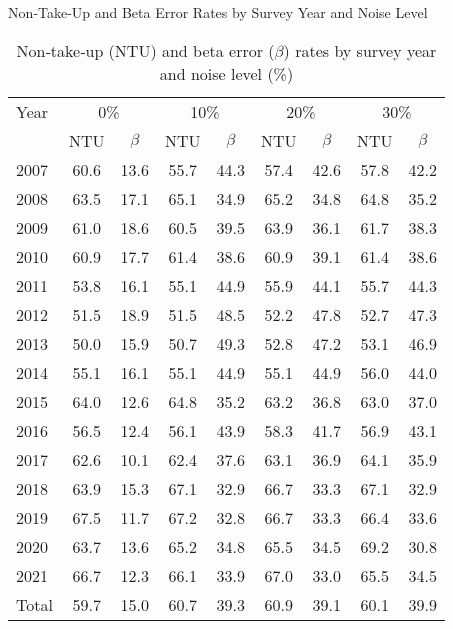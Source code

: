 \begin{table}[htbp]
\setlength{\tabcolsep}{10pt}
\small
\centering
\caption*{Non‑Take‑Up and Beta Error Rates by Survey Year and Noise Level}
\begin{tabular}{l|cc|cc|cc|cc}
\toprule
Year 
  & \multicolumn{2}{c|}{0\%} 
  & \multicolumn{2}{c|}{10\%} 
  & \multicolumn{2}{c|}{20\%} 
  & \multicolumn{2}{c}{30\%} \\
     & NTU & $\beta$ 
     & NTU & $\beta$ 
     & NTU & $\beta$ 
     & NTU & $\beta$ \\
\midrule
2007 & 60.6 & 13.6 & 55.7 & 44.3 & 57.4 & 42.6 & 57.8 & 42.2 \\
2008 & 63.5 & 17.1 & 65.1 & 34.9 & 65.2 & 34.8 & 64.8 & 35.2 \\
2009 & 61.0 & 18.6 & 60.5 & 39.5 & 63.9 & 36.1 & 61.7 & 38.3 \\
2010 & 60.9 & 17.7 & 61.4 & 38.6 & 60.9 & 39.1 & 61.4 & 38.6 \\
2011 & 53.8 & 16.1 & 55.1 & 44.9 & 55.9 & 44.1 & 55.7 & 44.3 \\
2012 & 51.5 & 18.9 & 51.5 & 48.5 & 52.2 & 47.8 & 52.7 & 47.3 \\
2013 & 50.0 & 15.9 & 50.7 & 49.3 & 52.8 & 47.2 & 53.1 & 46.9 \\
2014 & 55.1 & 16.1 & 55.1 & 44.9 & 55.1 & 44.9 & 56.0 & 44.0 \\
2015 & 64.0 & 12.6 & 64.8 & 35.2 & 63.2 & 36.8 & 63.0 & 37.0 \\
2016 & 56.5 & 12.4 & 56.1 & 43.9 & 58.3 & 41.7 & 56.9 & 43.1 \\
2017 & 62.6 & 10.1 & 62.4 & 37.6 & 63.1 & 36.9 & 64.1 & 35.9 \\
2018 & 63.9 & 15.3 & 67.1 & 32.9 & 66.7 & 33.3 & 67.1 & 32.9 \\
2019 & 67.5 & 11.7 & 67.2 & 32.8 & 66.7 & 33.3 & 66.4 & 33.6 \\
2020 & 63.7 & 13.6 & 65.2 & 34.8 & 65.5 & 34.5 & 69.2 & 30.8 \\
2021 & 66.7 & 12.3 & 66.1 & 33.9 & 67.0 & 33.0 & 65.5 & 34.5 \\
\midrule
Total
     & 59.7 & 15.0 & 60.7 & 39.3 & 60.9 & 39.1 & 60.1 & 39.9 \\
\bottomrule
\end{tabular}
\caption{\small{Non‑take‑up (NTU) and beta error ($\beta$) rates by survey year and noise level (\%)}}
\label{tab:conditional_probs_noise}
\end{table}
